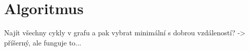 \section{Algoritmus}

Najít všechny cykly v grafu a pak vybrat minimální s dobrou vzdáleností? -> příšerný, ale funguje to...